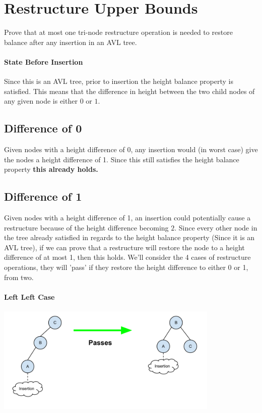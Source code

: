 \documentclass[12pt]{article}
\begin{document}
\section{Restructure Upper Bounds}
Prove that at most one tri-node restructure operation is needed to restore balance after any insertion in an AVL tree.
\paragraph{State Before Insertion}
Since this is an AVL tree, prior to insertion the height balance property is satisfied. This means that the difference in height between the two child nodes of any given node is either $0$ or $1$.
\subsection{Difference of 0} Given nodes with a height difference of 0, any insertion would (in worst case) give the nodes a height difference of 1. Since this still satisfies the height balance property {\bf this already holds.}
\subsection{Difference of 1} Given nodes with a height difference of 1, an insertion could potentially cause a restructure because of the height difference becoming $2$.
Since every other node in the tree already satisfied in regards to the height balance property (Since it is an AVL tree), if we can prove that a restructure will restore the node to a height difference of at most 1, then this holds.
We'll consider the 4 cases of restructure operations, they will 'pass' if they restore the height difference to either 0 or 1, from two.
\paragraph{Left Left Case}
\begin{center}
\includegraphics[width=0.8\textwidth]{figures/avl-case1.png}
\end{center}
\end{document}
